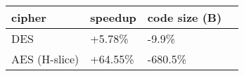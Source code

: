 \begin{tabular}{|l K{3cm}|K{3cm}|K{3cm}|}
  \hline
  \textbf{cipher} & \textbf{speedup} & \textbf{code size (B)}\\
  \hline
  DES & +5.78\% & -9.9\% \\
  \hline
  AES (H-slice) & +64.55\% & -680.5\% \\
  \hline
\end{tabular}